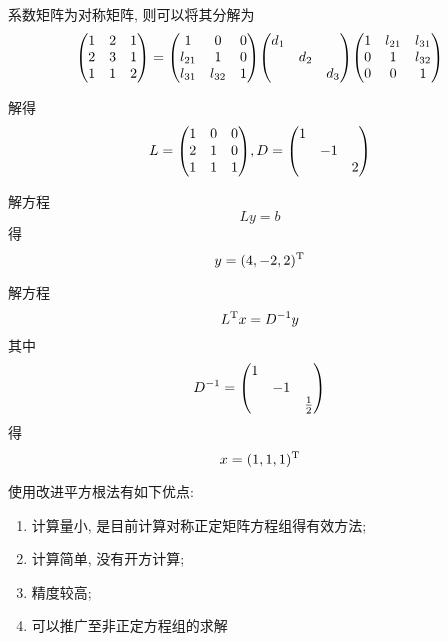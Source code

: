 \begin{solution}
    系数矩阵为对称矩阵, 则可以将其分解为
    \begin{equation*}
        \mqty(
            1&2&1\\
            2&3&1\\
            1&1&2
        )=\mqty(
            1&0&0\\
            l_{21}&1&0\\
            l_{31}&l_{32}&1
        )\mqty(
            d_1&&\\
            &d_2&\\
            &&d_3
        )\mqty(
            1&l_{21}&l_{31}\\
            0&1&l_{32}\\
            0&0&1
        )
    \end{equation*}

    解得
    \begin{equation*}
        L=\mqty(
            1&0&0\\
            2&1&0\\
            1&1&1
        ), D=\mqty(
            1&&\\
            &-1&\\
            &&2
        )
    \end{equation*}

    解方程
    \begin{equation*}
        Ly=b
    \end{equation*}
    得
    \begin{equation*}
        y=(4,-2,2)^\text{T}
    \end{equation*}
    
    解方程
    \begin{equation*}
        L^\text{T}x=D^{-1}y
    \end{equation*}
    其中
    \begin{equation*}
        \inv{D}=\mqty(
            1&&\\
            &-1&\\
            &&\frac{1}{2}
        )
    \end{equation*}
    得
    \begin{equation*}
        x=(1,1,1)^\text{T}
    \end{equation*}
\end{solution}

使用改进平方根法有如下优点:
\begin{enumerate}
    \item 计算量小, 是目前计算对称正定矩阵方程组得有效方法;
    \item 计算简单, 没有开方计算;
    \item 精度较高;
    \item 可以推广至非正定方程组的求解
\end{enumerate}

